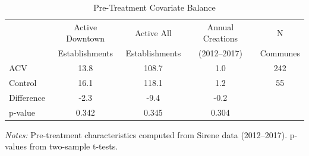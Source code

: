 \begin{table}[ht]
\centering
\caption{Pre-Treatment Covariate Balance}
\label{tab:balance}
\begin{tabular}{lcccc}
\toprule
 & Active Downtown & Active All & Annual Creations & N \\
 & Establishments & Establishments & (2012--2017) & Communes \\
\midrule
ACV & 13.8 & 108.7 & 1.0 & 242 \\
Control & 16.1 & 118.1 & 1.2 & 55 \\
\midrule
Difference & -2.3 & -9.4 & -0.2 & \\
p-value & 0.342 & 0.345 & 0.304 & \\
\bottomrule
\end{tabular}
\begin{tablenotes}\small
\item \textit{Notes:} Pre-treatment characteristics computed from Sirene data (2012--2017). p-values from two-sample t-tests.
\end{tablenotes}
\end{table}
